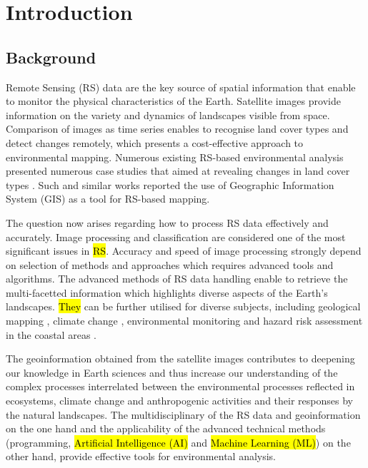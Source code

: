 \documentclass[final,5p,times,twocolumn]{elsarticle}
\numberwithin{table}{section}
\begin{document}
\section{Introduction}

\subsection{Background}
Remote Sensing (RS) data are the key source of spatial information that enable to monitor the physical characteristics of the Earth. Satellite images provide information on the variety and dynamics of landscapes visible from space. Comparison of images as time series enables to recognise land cover types and detect changes remotely, which presents a cost-effective approach to environmental mapping. Numerous existing RS-based environmental analysis presented numerous case studies that aimed at revealing changes in land cover types \cite{geosciences12100357,976724,Lemenkova202211,6723424}. Such and similar works reported the use of Geographic Information System (GIS) as a tool for RS-based mapping.

The question now arises regarding how to process RS data effectively and accurately. Image processing and classification are considered one of the most significant issues in \hl{RS}. Accuracy and speed of image processing strongly depend on selection of methods and approaches which requires advanced tools and algorithms. The advanced methods of RS data handling enable to retrieve the multi-facetted information which highlights diverse aspects of the Earth's landscapes. \hl{They} can be further utilised for diverse subjects, including geological mapping \cite{AbdAlHai,Hussien}, climate change \cite{Ramat,w16081141,Seif}, environmental monitoring \cite{Govender,Lemenkova20241326} and hazard risk assessment in the coastal areas \cite{ELSHAZLY2024261,Sun,Kamh,ElRaey,LemenkovaCap,Braham}. 

The geoinformation obtained from the satellite images contributes to deepening our knowledge in Earth sciences and thus increase our understanding of the complex processes interrelated between the environmental processes reflected in ecosystems, climate change and anthropogenic activities and their responses by the natural landscapes. The multidisciplinary of the RS data and geoinformation on the one hand and the applicability of the advanced technical methods (programming, \hl{Artificial Intelligence (AI)} and \hl{Machine Learning (ML)}) on the other hand, provide effective tools for environmental analysis. 
\end{document}
